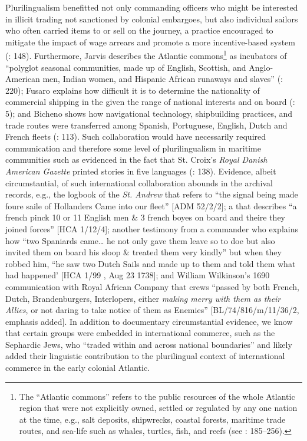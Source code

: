 Plurilingualism benefitted not only commanding officers who might be interested in illicit trading not sanctioned by colonial embargoes, but also individual sailors who often carried items to  or sell on the journey, a practice encouraged to mitigate the impact of wage arrears and promote a more incentive-based system (\citealt{Jarvis2010}: 148). Furthermore, Jarvis describes the Atlantic commons\footnote{The “Atlantic commons” refers to the public resources of the whole Atlantic region that were not explicitly owned, settled or regulated by any one nation at the time, e.g., salt deposits, shipwrecks, coastal forests, maritime trade routes, and sea-life such as whales, turtles, fish, and reefs (see \citealt{Jarvis2010}: 185–256).} as incubators of “polyglot seasonal communities, made up of English, Scottish, and Anglo-American men, Indian women, and Hispanic African runaways and slaves” (\citeyear*{Jarvis2010}: 220); Fusaro explains how difficult it is to determine the nationality of commercial shipping in the  given the range of national interests and  on board (\citeyear*{Fusaro2015}: 5); and Bicheno shows how navigational technology, shipbuilding practices, and trade routes were transferred among Spanish, Portuguese, English, Dutch and French fleets (\citeyear*{Bicheno2012}: 113). Such collaboration would have necessarily required communication and therefore some level of plurilingualism in maritime communities such as evidenced in the fact that St. Croix’s \textit{Royal Danish American Gazette} printed stories in five languages (\citealt{Jarvis2010}: 138). Evidence, albeit circumstantial, of such international collaboration abounds in the archival records, e.g., the logbook of the \textit{St. Andrew} that refers to “the signal being made foure saile of Hollanders Came into our fleet” [ADM 52/2/2]; a  that describes “a french pinck 10 or 11 English men \& 3 french boyes on board and theire they joined forces” [HCA 1/12/4]; another testimony from a commander who explains how “two Spaniards came… he not only gave them leave so to doe but also invited them on board his sloop \& treated them very kindly” but when they robbed him, “he saw two Dutch Sails and made up to them and told them what had happened’ [HCA 1/99 , Aug 23 1738]; and William Wilkinson’s 1690 communication with Royal African Company that  crews “passed by both French, Dutch, Brandenburgers, Interlopers, either \textit{making merry with them as their Allies}, or not daring to take notice of them as Enemies” [BL/74/816/m/11/36/2, emphasis added]. In addition to documentary circumstantial evidence, we know that certain groups were embedded in international commerce, such as the Sephardic Jews, who “traded within and across national boundaries” \citep[20]{Jarvis2010} and likely added their linguistic contribution to the plurilingual context of international commerce in the early colonial Atlantic. 

